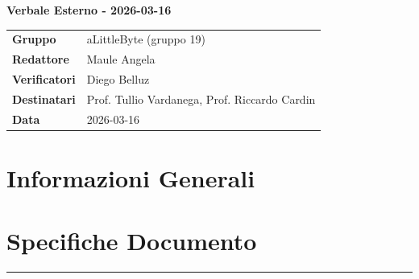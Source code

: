 \documentclass[a4paper,12pt]{article}
\begin{document}
\thispagestyle{firstpage}

\vspace*{0.5cm}

\begin{center}
    {\LARGE \textbf{Verbale Esterno - 2026-03-16}}
\end{center}

\vspace{1.5cm}

\begin{center}
    \renewcommand{\arraystretch}{1.3}
    \begin{tcolorbox}[
        width=0.92\textwidth,
        colback=gray!6,
        colframe=gray!45,
        boxrule=0.5pt,
        arc=2mm,
        boxsep=0pt,
        left=8pt, right=8pt, top=8pt, bottom=8pt
    ]
        \begin{tabularx}{\linewidth}{>{\bfseries}p{3.5cm} X}
            Gruppo      & aLittleByte (gruppo 19) \\
            Redattore   & Maule Angela \\
            Verificatori& Diego Belluz\\
            Destinatari & Prof. Tullio Vardanega, Prof. Riccardo Cardin \\
            Data        &  2026-03-16\\
        \end{tabularx}
    \end{tcolorbox}
\end{center}

\newpage

\tableofcontents
\newpage

\section{Informazioni Generali}
\section*{Specifiche Documento}
\hrule
\vspace{1cm}
\end{document}
